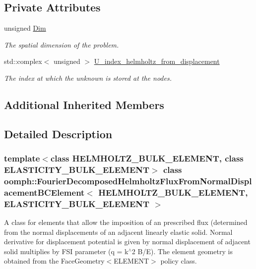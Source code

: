 \subsection*{Private Attributes}
\begin{DoxyCompactItemize}
\item 
unsigned \hyperlink{classoomph_1_1FourierDecomposedHelmholtzFluxFromNormalDisplacementBCElement_ac3f8d4afa7b803c75d7f3cb8e07a48ca}{Dim}
\begin{DoxyCompactList}\small\item\em The spatial dimension of the problem. \end{DoxyCompactList}\item 
std\+::complex$<$ unsigned $>$ \hyperlink{classoomph_1_1FourierDecomposedHelmholtzFluxFromNormalDisplacementBCElement_a5b1225f509b692ab0027477785a56d35}{U\+\_\+index\+\_\+helmholtz\+\_\+from\+\_\+displacement}
\begin{DoxyCompactList}\small\item\em The index at which the unknown is stored at the nodes. \end{DoxyCompactList}\end{DoxyCompactItemize}
\subsection*{Additional Inherited Members}


\subsection{Detailed Description}
\subsubsection*{template$<$class H\+E\+L\+M\+H\+O\+L\+T\+Z\+\_\+\+B\+U\+L\+K\+\_\+\+E\+L\+E\+M\+E\+NT, class E\+L\+A\+S\+T\+I\+C\+I\+T\+Y\+\_\+\+B\+U\+L\+K\+\_\+\+E\+L\+E\+M\+E\+NT$>$\newline
class oomph\+::\+Fourier\+Decomposed\+Helmholtz\+Flux\+From\+Normal\+Displacement\+B\+C\+Element$<$ H\+E\+L\+M\+H\+O\+L\+T\+Z\+\_\+\+B\+U\+L\+K\+\_\+\+E\+L\+E\+M\+E\+N\+T, E\+L\+A\+S\+T\+I\+C\+I\+T\+Y\+\_\+\+B\+U\+L\+K\+\_\+\+E\+L\+E\+M\+E\+N\+T $>$}

A class for elements that allow the imposition of an prescribed flux (determined from the normal displacements of an adjacent linearly elastic solid. Normal derivative for displacement potential is given by normal displacement of adjacent solid multiplies by F\+SI parameter (q = k$^\wedge$2 B/E). The element geometry is obtained from the Face\+Geometry$<$\+E\+L\+E\+M\+E\+N\+T$>$ policy class. 

